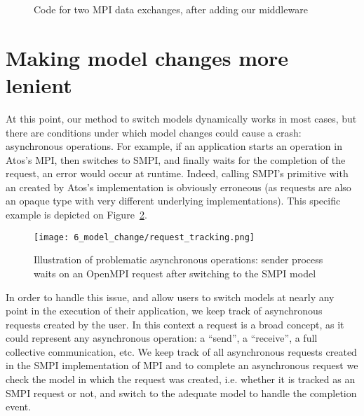 \begin{figure}[!b]
    
    \caption{Code for two MPI data exchanges, after adding our middleware}
    \label{fig:6_model_change:sync_operations_code}
\end{figure}

\section{Making model changes more lenient}
\label{sec:6_model_change:request_tracking}

At this point, our method to switch models dynamically works in most cases, but
there are conditions under which model changes could cause a crash: asynchronous
operations. For example, if an application starts an operation in Atos's MPI,
then switches to SMPI, and finally waits for the completion of the request, an
error would occur at runtime. Indeed, calling SMPI's  primitive
with an  created by Atos's implementation is obviously
erroneous (as requests are also an opaque type with very different underlying
implementations). This specific example is depicted on
Figure~\ref{fig:6_model_change:request_tracking_example}.

\begin{figure}[!ht]
    \centering
    \texttt{[image: 6\_model\_change/request\_tracking.png]}
    \caption{Illustration of problematic asynchronous operations: sender process waits on an OpenMPI request after switching to the SMPI model}
    \label{fig:6_model_change:request_tracking_example}
\end{figure}

In order to handle this issue, and allow users to switch models at nearly any
point in the execution of their application, we keep track of  asynchronous
requests created by the user. In this context a request is a broad concept, as
it could represent any asynchronous operation: a ``send'', a ``receive'', a full
collective communication, etc. We keep track of all asynchronous requests
created in the SMPI implementation of MPI and to complete an asynchronous
request we check the model in which the request was created, i.e. whether it is
tracked as an SMPI request or not, and switch to the adequate model to handle
the completion event.

